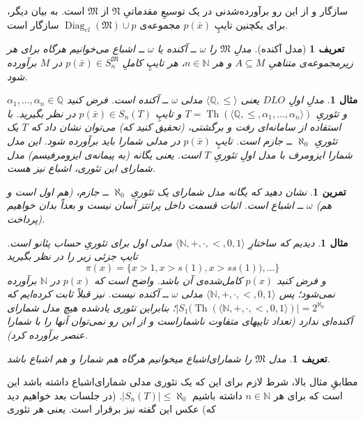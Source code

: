 \documentclass[12pt,a4paper]{report}
\theoremstyle{colorhead}
\newtheorem{tam}[thm]{تمرین}
\newtheorem{mesal}[thm]{مثال}
\newtheorem{defn}[thm]{تعریف}
\DeclareMathOperator{\Th}{Th}
\DeclareMathOperator{\diag}{Diag}
\begin{document}
سازگار و از این رو برآورده‌شدنی در یک توسیعِ مقدماتیِ
$\mathfrak{N}$
از
$\mathfrak{M}$
است. به بیان دیگر، برای یکچنین تایپِ
$p(\bar{x})$
مجموعه‌ی
$\diag_{el}(\mathfrak{M})\cup p$
سازگار است. 
\begin{defn}[مدل آکنده]
مدلِ
$\mathfrak{M}$
را
$\omega$ ــ
آکنده یا
$\omega$ ــ
اشباع 
می‌خوانیم هرگاه برای هر زیرمجموعه‌ی متناهیِ
$A\subseteq M$
و هر
$n\in \mathbb{N}$،
هر تایپِ کاملِ
$p(\bar{x})\in S_n^\mathfrak{M}$
در
$M$
برآورده شود.
\end{defn}
\begin{mesal}
مدلِ اولِ 
$DLO$
یعنی
$\langle \mathbb{Q},\leq\rangle$
مدلی
$\omega$ ــ
آکنده است. فرض کنید
$\alpha_1,\ldots,\alpha_n\in \mathbb{Q}$
و
تئوریِ
$T=\Th(\langle \mathbb{Q},\leq,\alpha_1,\ldots,\alpha_n\rangle)$
و تایپِ
$p(\bar{x})\in S_n(T)$
 در نظر بگیرید. با استفاده از سامانه‌ای رفت و برگشتی، (تحقیق کنید که) می‌توان نشان داد که
 $T$
 یک تئوریِ
 $\aleph_0$
 ــ
 جازم است.
تایپِ
$p(\bar{x})$
در مدلی شمارا باید برآورده شود. این مدل شمارا ایزومرف با مدل اولِ تئوریِ
$T$
است. یعنی یگانه 
(به پیمانه‌ی ایزومرفیسم)‌
مدل  شمارای این تئوری، اشباع 
 نیز هست. 
\end{mesal}
\begin{tam}
نشان دهید که یگانه مدل شمارای یک تئوریِ
$\aleph_0$ ــ
جازم، (هم اول است و هم) 
$\omega$ ــ
اشباع است. اثبات قسمت داخل پرانتز آسان نیست و بعداً بدان خواهیم پرداخت).
\end{tam}
\begin{mesal}
دیدیم که ساختارِ
$\langle \mathbb{N},+,\cdot,<,0,1\rangle$
مدلی اول برای تئوریِ
حساب پئانو است. تایپ جزئی زیر را در نظر بگیرید
\[
\pi(x)=\{x>1,x>s(1),x>ss(1)),\ldots\}
\]
و فرض کنید
$p(x)$
کامل‌شده‌ی آن باشد. واضح است که 
$p(x)$
در
$\mathbb{N}$
برآورده نمی‌شود؛ پس
$\langle \mathbb{N},+,\cdot,<,0,1\rangle$
مدلی 
$\omega$ ــ
آکنده نیست.  نیز قبلاً ثابت کرده‌ایم که 
\mbox{$|S_1(\Th(\langle \mathbb{N},+,\cdot,<,0,1\rangle)|=2^{\aleph_0}$؛}
بنابراین تئوری یادشده هیچ مدل 
شمارای آکنده‌ای  ندارد (تعداد تایپهای متفاوت ناشماراست و از این رو نمی‌توان آنها را با  شمارا عنصر برآورده کرد).
\end{mesal}
\begin{defn}
مدل
$\mathfrak{M}$
را شمارای‌اشباع
 میخوانیم هرگاه هم شمارا و هم اشباع باشد. 
\end{defn}
مطابقِ مثال بالا، شرط لازم برای این که یک تئوری مدلی شمارای‌اشباع داشته باشد این است که برای هر
$n\in \mathbb{N}$
داشته باشیم
$|S_n(T)|\leq \aleph_0$.
(در جلسات بعد خواهیم دید که)
عکس این گفته نیز برقرار است. یعنی هر تئوری 
\end{document}
